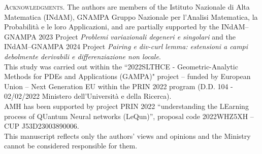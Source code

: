 \documentclass[11pt,leqno]{amsart}
\theoremstyle{remark}
\theoremstyle{definition}
\theoremstyle{definition}
\begin{document}
\textsc{Acknowledgments.}
The authors are members of  the Istituto Nazionale di Alta Matematica (INdAM), GNAMPA Gruppo Nazionale per l'Analisi Matematica, la Probabilità e le loro Applicazioni, and are partially supported by the INdAM--GNAMPA 2023 Project \textit{Problemi variazionali degeneri e singolari} and the INdAM--GNAMPA 2024 Project \textit{Pairing e div-curl lemma: estensioni a campi debolmente derivabili e diﬀerenziazione non locale}.\\
This study was carried out within the ``2022SLTHCE - Geometric-Analytic Methods for PDEs and Applications (GAMPA)" project – funded by European Union – Next Generation EU  within the PRIN 2022 program (D.D. 104 - 02/02/2022 Ministero dell’Università e della Ricerca).\\
AMH has been supported by project PRIN 2022 
``understanding the LEarning process of QUantum Neural networks (LeQun)'', proposal code 2022WHZ5XH -- CUP J53D23003890006.
\\
This manuscript reflects only the authors’ views and opinions and the Ministry cannot be considered responsible for them.
\end{document}
